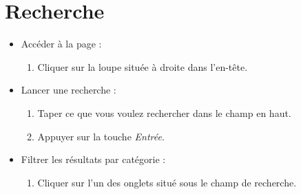 \documentclass[12pt, letterpaper]{article}
\begin{document}
    \section*{Recherche}
    \begin{itemize}
        \item Accéder à la page :
        \begin{enumerate}
            \item Cliquer sur la loupe située à droite dans l'en-tête.
        \end{enumerate}
        
        \item Lancer une recherche :
        \begin{enumerate}
            \item Taper ce que vous voulez rechercher dans le champ en haut.
            \item Appuyer sur la touche \textit{Entrée}.
        \end{enumerate}

        \item Filtrer les résultats par catégorie :
        \begin{enumerate}
            \item Cliquer sur l'un des onglets situé sous le champ de recherche.
        \end{enumerate}
    \end{itemize}
    
\end{document}
